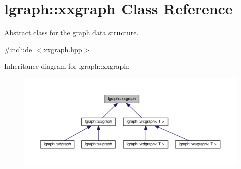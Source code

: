 \hypertarget{classlgraph_1_1xxgraph}{}\section{lgraph\+:\+:xxgraph Class Reference}
\label{classlgraph_1_1xxgraph}


Abstract class for the graph data structure.  




{\ttfamily \#include $<$xxgraph.\+hpp$>$}



Inheritance diagram for lgraph\+:\+:xxgraph\+:\nopagebreak
\begin{figure}[H]
\begin{center}
\leavevmode
\includegraphics[width=350pt]{classlgraph_1_1xxgraph__inherit__graph}
\end{center}
\end{figure}
